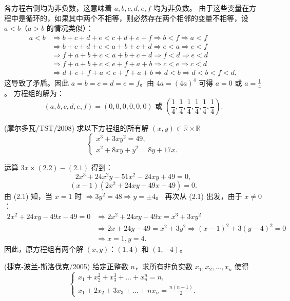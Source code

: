 \begin{questions}
\begin{solution}
各方程右侧均为非负数，这意味着 $a, b, c, d, e, f$ 均为非负数。
由于这些变量在方程中是循环的，如果其中两个不相等，则必然存在两个相邻的变量不相等，设 $a < b$（$a > b$ 的情况类似）：
\begin{align*}
a < b &\Rightarrow b + c + d + e < c + d + e + f \Rightarrow b < f \Rightarrow a < f \\
&\Rightarrow b + c + d + e < a + b + c + d \Rightarrow e < a \Rightarrow e < f \\
&\Rightarrow f + a + b + c < a + b + c + d \Rightarrow f < d \Rightarrow e < d \\
&\Rightarrow f + a + b + c < e + f + a + b \Rightarrow c < e \Rightarrow c < d \\
&\Rightarrow d + e + f + a < e + f + a + b \Rightarrow d < b \Rightarrow d < b < f < d,
\end{align*}
这导致了矛盾。因此 $a = b = c = d = e = f$。由 $4a = (4a)^4$ 可得 $a = 0$ 或 $a = \frac{1}{4}$。
方程组的解为：
\[
(a, b, c, d, e, f) = (0, 0, 0, 0, 0, 0) \text{ 或 } \left( \frac{1}{4}, \frac{1}{4}, \frac{1}{4}, \frac{1}{4}, \frac{1}{4}, \frac{1}{4} \right).
\]
\end{solution}

\question (摩尔多瓦/TST/2008) 求以下方程组的所有解 $(x, y) \in \mathbb{R} \times \mathbb{R}$
\[
\begin{cases} x^3 + 3xy^2 = 49, \\ x^2 + 8xy + y^2 = 8y + 17x. \end{cases}
\]

\begin{solution}
运算 $3x \times (2.2) - (2.1)$ 得到：
\[
2x^3 + 24x^2y - 51x^2 - 24xy + 49 = 0,
\]
\[
(x - 1)(2x^2 + 24xy - 49x - 49) = 0.
\]
由 (2.1) 知，当 $x = 1$ 时 $\Rightarrow 3y^2 = 48 \Rightarrow y = \pm 4$。
再次从 (2.1) 出发，由于 $x \neq 0$：
\begin{align*}
2x^2 + 24xy - 49x - 49 = 0 &\Rightarrow 2x^2 + 24xy - 49x = x^3 + 3xy^2 \\
&\Rightarrow 2x + 24y - 49 = x^2 + 3y^2 \Rightarrow (x - 1)^2 + 3(y - 4)^2 = 0 \\
&\Rightarrow x = 1, y = 4.
\end{align*}
因此，原方程组有两个解 $(x, y)$：$(1, 4)$ 和 $(1, -4)$。
\end{solution}

\question (捷克-波兰-斯洛伐克/2005) 给定正整数 $n$，求所有非负实数 $x_1, x_2, \dots, x_n$ 使得
\[
\begin{cases} x_1 + x_2^2 + x_3^3 + \dots + x_n^n = n, \\ x_1 + 2x_2 + 3x_3 + \dots + nx_n = \frac{n(n + 1)}{2}. \end{cases}
\]


\end{questions}
